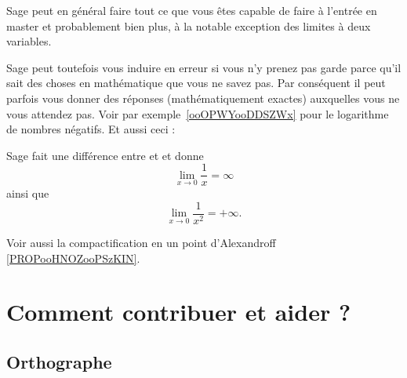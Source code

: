 Sage peut en général faire tout ce que vous êtes capable de faire à l'entrée en master et probablement bien plus, à la notable exception des limites à deux variables.

\begin{remark}	\label{REMooINTROsageAttention}
	Sage peut toutefois vous induire en erreur si vous n'y prenez pas garde parce qu'il sait des choses en mathématique que vous ne savez pas. Par conséquent il peut parfois vous donner des réponses (mathématiquement exactes) auxquelles vous ne vous attendez pas. Voir par exemple~\ref{ooOPWYooDDSZWx} pour le logarithme de nombres négatifs. Et aussi ceci :

	

	Sage fait une différence entre  et  et donne
	\begin{equation}
		\lim_{x\to 0} \frac{1}{ x }=\infty
	\end{equation}
	ainsi que
	\begin{equation}
		\lim_{x\to 0} \frac{1}{ x^2 }=+\infty.
	\end{equation}
\end{remark}

Voir aussi la compactification en un point d'Alexandroff \ref{PROPooHNOZooPSzKIN}.

\section{Comment contribuer et aider ?}
\label{SecooCKWWooBFgnea}

\subsection{Orthographe}

